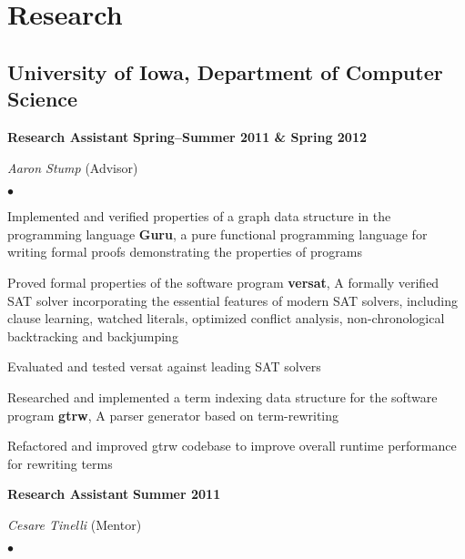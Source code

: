 \documentclass[10pt,letterpaper]{article}
\renewenvironment{itemize}{
  \begin{list}{}{
      \setlength{\leftmargin}{1.5em}
      \setlength{\itemsep}{0.25em}
      \setlength{\parskip}{0pt}
      \setlength{\parsep}{0.25em}
    }
  }{
  \end{list}
}
\newenvironment{bitemize}{
  \begin{list}{\(\bullet \)}{
      \setlength{\leftmargin}{1.5em}
      \setlength{\itemsep}{0.25em}
      \setlength{\parskip}{0pt}
      \setlength{\parsep}{0.25em}
    }
  }{
  \end{list}
}
\newcommand{\yearrange}[1]{\hfill \textbf{#1} \par}
\begin{document}
\section*{Research}

\subsection*{University of Iowa, Department of Computer Science}

\begin{itemize}
  \item \textbf{Research Assistant} \yearrange{Spring--Summer 2011 %
          \& Spring 2012}
        \textit{Aaron Stump} (Advisor)
        \begin{bitemize}
          \item Implemented and verified properties of a graph data structure in the
          programming language \textbf{Guru}, a pure functional programming language
          for writing formal proofs demonstrating the properties of programs
          \item Proved formal properties of the software program \textbf{versat}, A
          formally verified SAT solver incorporating the essential features of modern
          SAT solvers, including clause learning, watched literals, optimized conflict
          analysis, non-chronological backtracking and backjumping
          \item Evaluated and tested versat against leading SAT solvers
          \item Researched and implemented a term indexing data structure for the
          software program \textbf{gtrw}, A parser generator based on term-rewriting
          \item Refactored and improved gtrw codebase to improve overall runtime
          performance for rewriting terms
        \end{bitemize}
  \item \textbf{Research Assistant} \yearrange{Summer 2011} \textit{Cesare
          Tinelli} (Mentor)
        \begin{bitemize}

\end{bitemize}
\end{itemize}
\end{document}
